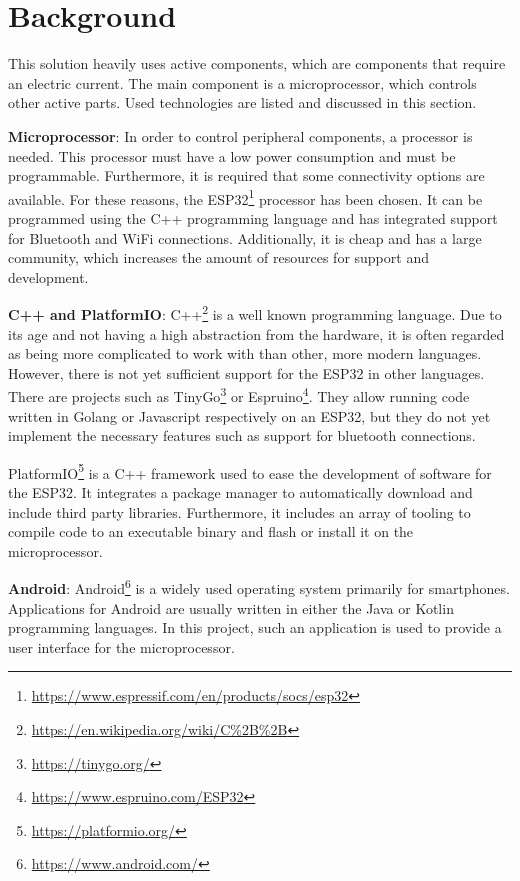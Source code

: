 \section{Background}\label{sec:background}

This solution heavily uses active components, which are components that require an electric current.
The main component is a microprocessor, which controls other active parts.
Used technologies are listed and discussed in this section.

\textbf{Microprocessor}: In order to control peripheral components, a processor is needed.
This processor must have a low power consumption and must be programmable.
Furthermore, it is required that some connectivity options are available.
For these reasons, the ESP32\footnote{\url{https://www.espressif.com/en/products/socs/esp32}} processor has been chosen.
It can be programmed using the C++ programming language and has integrated support for Bluetooth and WiFi connections.
Additionally, it is cheap and has a large community, which increases the amount of resources for support and development.

\textbf{C++ and PlatformIO}: C++\footnote{\url{https://en.wikipedia.org/wiki/C\%2B\%2B}} is a well known programming language.
Due to its age and not having a high abstraction from the hardware, it is often regarded as being more complicated to work with than other, more modern languages.
However, there is not yet sufficient support for the ESP32 in other languages.
There are projects such as TinyGo\footnote{\url{https://tinygo.org/}} or Espruino\footnote{\url{https://www.espruino.com/ESP32}}.
They allow running code written in Golang or Javascript respectively on an ESP32, but they do not yet implement the necessary features such as support for bluetooth connections.

PlatformIO\footnote{\url{https://platformio.org/}} is a C++ framework used to ease the development of software for the ESP32.
It integrates a package manager to automatically download and include third party libraries.
Furthermore, it includes an array of tooling to compile code to an executable binary and flash or install it on the microprocessor.

\textbf{Android}: Android\footnote{\url{https://www.android.com/}} is a widely used operating system primarily for smartphones.
Applications for Android are usually written in either the Java or Kotlin programming languages.
In this project, such an application is used to provide a user interface for the microprocessor.

